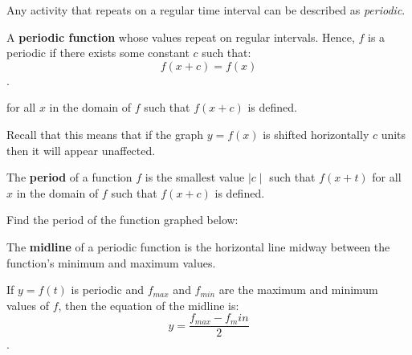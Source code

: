 
Any activity that repeats on a regular time interval can be described as
\textit{periodic}.

\begin{definition}
  \label{def:periodic_function}

  A \textbf{periodic function} whose values repeat on regular intervals. Hence,
  $f$ is a periodic if there exists some constant $c$ such that:
  \[ f(x + c) = f(x) \].

  for all $x$ in the domain of $f$ such that $f(x + c)$ is defined.

  Recall that this means that if the graph $y = f(x)$ is shifted horizontally $c$ 
  units then it will appear unaffected.
\end{definition}

\begin{definition}[Period]
  \label{def:period}

  The \textbf{period} of a function $f$ is the smallest value $\mid c \mid$ such
  that $f(x + t)$ for all $x$ in the domain of $f$ such that $f(x + c)$ is
  defined.
\end{definition}

\begin{exc}
  \label{exc:period}

  Find the period of the function graphed below:

  \begin{figure}[H]
    \centering


    \caption{}
    \label{fig:find_the_midline_and_period}
  \end{figure}
\end{exc}

\begin{definition}[Midline]
  \label{def:midline}

  The \textbf{midline} of a periodic function is the horizontal line midway
  between the function's minimum and maximum values.

  If $y = f(t)$ is periodic and $f_{max}$ and $f_{min}$ are the maximum and
  minimum values of $f$, then the equation of the midline is:
  \[ y = \frac{f_{max} - f_min}{2} \].
\end{definition}

